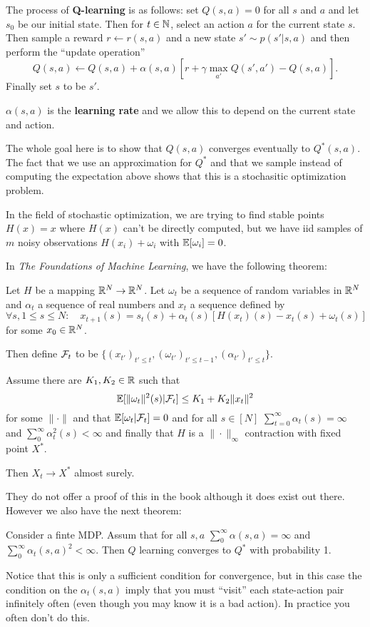 \documentclass[12pt]{article}
\begin{document}
\begin{defn}
	The process of \textbf{Q-learning} is as follows: set $Q(s,a)=0$ for all $s$ and $a$ and let $s_0$ be our initial state. Then for $t\in\mathbb{N}$,
	select an action $a$ for the current state $s$. Then sample a reward $r\leftarrow r(s,a)$ and a new state $s'\sim p(s'|s,a)$ and then perform the ``update operation''
	\[Q(s,a)\leftarrow Q(s,a)+\alpha(s,a)[r+\gamma\max_{a'}Q(s',a')-Q(s,a)].\]
	Finally set $s$ to be $s'$.
\end{defn}
\begin{rmk}
	$\alpha(s,a)$ is the \textbf{learning rate} and we allow this to depend on the current state and action.
\end{rmk}
\begin{rmk}
	The whole goal here is to show that $Q(s,a)$ converges eventually to $Q^\ast(s,a)$. The fact that we use an approximation for $Q^\ast$ and that we sample instead of computing the expectation above shows that this is a stochasitic optimization problem.
\end{rmk}

In the field of stochastic optimization, we are trying to find stable points $H(x)=x$ where $H(x)$ can't be directly computed, but we have iid samples of $m$ noisy observations $H(x_i)+\omega_i$ with $\mathbb{E}[\omega_i]=0$.

In \textit{The Foundations of Machine Learning}, we have the following theorem:
\begin{thm}
	Let $H$ be a mapping $\mathbb{R}^N\to \mathbb{R}^N$. Let $\omega_t$ be a sequence of random variables in $\mathbb{R}^N$ and $\alpha_t$ a sequence of real numbers and $x_t$ a sequence defined by 
	\[\forall s, 1\le s\le N:\quad x_{t+1}(s)=s_t(s)+\alpha_t(s)[H(x_t)(s)-x_t(s)+\omega_t(s)]\]
	for some $x_0\in \mathbb{R}^N$. 

	Then define $\mathcal{F}_t$ to be $\{(x_{t'})_{t'\le t},(\omega_{t'})_{t'\le t-1}, (\alpha_{t'})_{t'\le t}\}$.

	Assume there are $K_1,K_2\in\mathbb{R}$ such that 
	\[\mathbb{E}[\|\omega_t\|^2(s)|\mathcal{F}_t]\le K_1+K_2\|x_t\|^2\]
	for some $\|\cdot\|$ and that $\mathbb{E}[\omega_t|\mathcal{F}_t]=0$ and for all $s\in[N]$ $\sum_{t=0}^\infty \alpha_t(s)=\infty$ and $\sum_0^\infty \alpha_t^2(s)<\infty$ and finally that $H$ is a $\|\cdot\|_\infty$ contraction with fixed point $X^\ast$.

	Then $X_t\to X^\ast$ almost surely.
\end{thm}
They do not offer a proof of this in the book although it does exist out there. However we also have the next theorem:
\begin{thm}
	Consider a finte MDP. Assum that for all $s,a$ $\sum_0^\infty \alpha(s,a)=\infty$ and $\sum_0^\infty \alpha_t(s,a)^2<\infty$. Then $Q$ learning converges to $Q^\ast$ with probability 1.
\end{thm}
\begin{rmk}
	Notice that this is only a sufficient condition for convergence, but in this case the condition on the $\alpha_t(s,a)$ imply that you must ``visit'' each state-action pair infinitely often (even though you may know it is a bad action).
	In practice you often don't do this.
\end{rmk}
\end{document}
